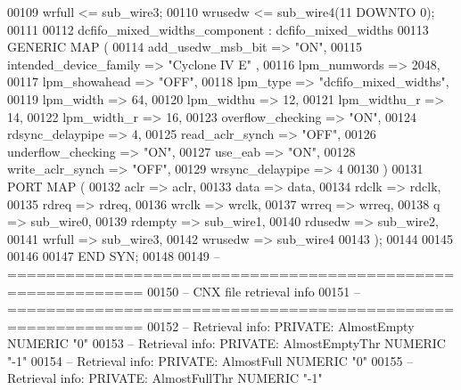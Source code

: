 \begin{DoxyCode}
{00109     \textcolor{vhdlchar}{wrfull}    \textcolor{vhdlchar}{<=} \textcolor{vhdlchar}{sub_wire3};
00110     \textcolor{vhdlchar}{wrusedw}    \textcolor{vhdlchar}{<=} \textcolor{vhdlchar}{sub_wire4}\textcolor{vhdlchar}{(}\textcolor{vhdllogic}{}\textcolor{vhdllogic}{11} \textcolor{keywordflow}{DOWNTO} \textcolor{vhdllogic}{}\textcolor{vhdllogic}{0}\textcolor{vhdlchar}{)};
00111 
00112     dcfifo_mixed_widths_component : dcfifo\_mixed\_widths
00113     \textcolor{keywordflow}{GENERIC} \textcolor{keywordflow}{MAP} (
00114         add\_usedw\_msb\_bit => \textcolor{keyword}{"ON"},
00115         intended\_device\_family => \textcolor{keyword}{"Cyclone IV E"}  ,
00116         lpm\_numwords => \textcolor{vhdllogic}{2048},
00117         lpm\_showahead => \textcolor{keyword}{"OFF"},
00118         lpm\_type => \textcolor{keyword}{"dcfifo\_mixed\_widths"},
00119         lpm\_width => \textcolor{vhdllogic}{64},
00120         lpm\_widthu => \textcolor{vhdllogic}{12},
00121         lpm\_widthu\_r => \textcolor{vhdllogic}{14},
00122         lpm\_width\_r => \textcolor{vhdllogic}{16},
00123         overflow\_checking => \textcolor{keyword}{"ON"},
00124         rdsync\_delaypipe => \textcolor{vhdllogic}{4},
00125         read\_aclr\_synch => \textcolor{keyword}{"OFF"},
00126         underflow\_checking => \textcolor{keyword}{"ON"},
00127         use\_eab => \textcolor{keyword}{"ON"},
00128         write\_aclr\_synch => \textcolor{keyword}{"OFF"},
00129         wrsync\_delaypipe => \textcolor{vhdllogic}{4}
00130     \textcolor{vhdlchar}{)}
00131     \textcolor{keywordflow}{PORT} \textcolor{keywordflow}{MAP} (
00132         aclr => aclr,
00133         data => data,
00134         rdclk => rdclk,
00135         rdreq => rdreq,
00136         wrclk => wrclk,
00137         wrreq => wrreq,
00138         q => sub_wire0,
00139         rdempty => sub_wire1,
00140         rdusedw => sub_wire2,
00141         wrfull => sub_wire3,
00142         wrusedw => sub_wire4
00143     \textcolor{vhdlchar}{)};
00144 
00145 
00146 
00147 \textcolor{keywordflow}{END} \textcolor{vhdlchar}{SYN};
00148 
00149 \textcolor{keyword}{-- ============================================================}
00150 \textcolor{keyword}{-- CNX file retrieval info}
00151 \textcolor{keyword}{-- ============================================================}
00152 \textcolor{keyword}{-- Retrieval info: PRIVATE: AlmostEmpty NUMERIC "0"}
00153 \textcolor{keyword}{-- Retrieval info: PRIVATE: AlmostEmptyThr NUMERIC "-1"}
00154 \textcolor{keyword}{-- Retrieval info: PRIVATE: AlmostFull NUMERIC "0"}
00155 \textcolor{keyword}{-- Retrieval info: PRIVATE: AlmostFullThr NUMERIC "-1"}
}
\end{DoxyCode}
